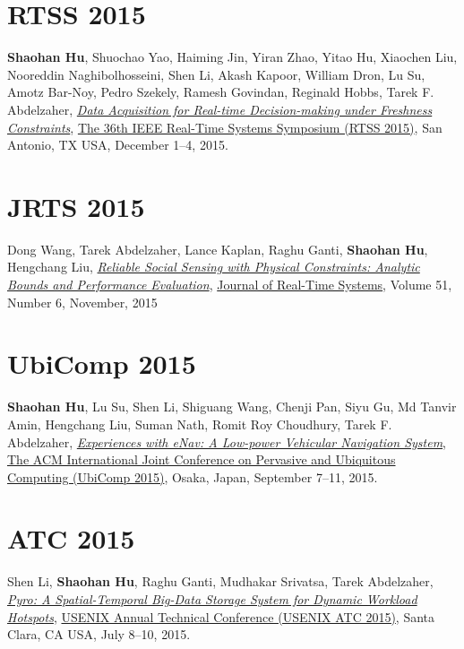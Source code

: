 \section{\sc RTSS 2015}\hypertarget{hu2015rtss}{}
\textbf{Shaohan Hu}, Shuochao Yao, Haiming Jin, Yiran Zhao, Yitao Hu, Xiaochen Liu, Nooreddin Naghibolhosseini, Shen Li, Akash Kapoor, William Dron, Lu Su, Amotz Bar-Noy, Pedro Szekely, Ramesh Govindan, Reginald Hobbs, Tarek F. Abdelzaher,
\href{http://ieeexplore.ieee.org/document/7383576}{\emph{Data Acquisition for Real-time Decision-making under Freshness Constraints}},
\href{http://2015.rtss.org/}{\textsf{The 36th IEEE Real-Time Systems Symposium (RTSS 2015)}},
San Antonio, TX USA, December 1--4, 2015.

\section{\sc JRTS 2015}\hypertarget{wang2015jrts}{}
Dong Wang, Tarek Abdelzaher, Lance Kaplan, Raghu Ganti, \textbf{Shaohan Hu}, Hengchang Liu,
\href{http://link.springer.com/article/10.1007%2Fs11241-015-9238-8}{\emph{Reliable Social Sensing with Physical Constraints: Analytic Bounds and Performance Evaluation}},
\href{http://link.springer.com/journal/11241}{\textsf{Journal of Real-Time Systems}},
Volume 51, Number 6, November, 2015

\section{\sc UbiComp 2015}\hypertarget{hu2015ubicomp}{}
\textbf{Shaohan Hu}, Lu Su, Shen Li, Shiguang Wang, Chenji Pan, Siyu Gu, Md Tanvir Amin, Hengchang Liu, Suman Nath, Romit Roy Choudhury, Tarek F. Abdelzaher,
\href{http://dl.acm.org/citation.cfm?id=2804287}{\emph{Experiences with eNav: A Low-power Vehicular Navigation System}},
\href{http://ubicomp.org/ubicomp2015/}{\textsf{The ACM International Joint Conference on Pervasive and Ubiquitous Computing (UbiComp 2015)}},
Osaka, Japan, September 7--11, 2015.

\section{\sc ATC 2015}\hypertarget{li2015atc}{}
Shen Li, \textbf{Shaohan Hu}, Raghu Ganti, Mudhakar Srivatsa, Tarek Abdelzaher,
\href{https://www.usenix.org/system/files/conference/atc15/atc15-paper-li-shen.pdf}{\emph{Pyro: A Spatial-Temporal Big-Data Storage System for Dynamic Workload Hotspots}},
\href{https://www.usenix.org/conference/atc15}{\textsf{USENIX Annual Technical Conference (USENIX ATC 2015)}},
Santa Clara, CA USA, July 8--10, 2015.

